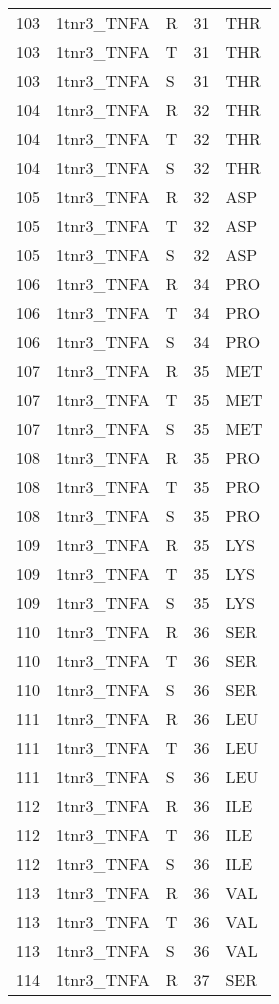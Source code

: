 \begin{tiny}
\begin{longtable}[l]{l|l|l|l|l}
	103 & 1tnr3\_TNFA & R & 31 & THR \\
	103 & 1tnr3\_TNFA & T & 31 & THR \\
	103 & 1tnr3\_TNFA & S & 31 & THR \\
	104 & 1tnr3\_TNFA & R & 32 & THR \\
	104 & 1tnr3\_TNFA & T & 32 & THR \\
	104 & 1tnr3\_TNFA & S & 32 & THR \\
	105 & 1tnr3\_TNFA & R & 32 & ASP \\
	105 & 1tnr3\_TNFA & T & 32 & ASP \\
	105 & 1tnr3\_TNFA & S & 32 & ASP \\
	106 & 1tnr3\_TNFA & R & 34 & PRO \\
	106 & 1tnr3\_TNFA & T & 34 & PRO \\
	106 & 1tnr3\_TNFA & S & 34 & PRO \\
	107 & 1tnr3\_TNFA & R & 35 & MET \\
	107 & 1tnr3\_TNFA & T & 35 & MET \\
	107 & 1tnr3\_TNFA & S & 35 & MET \\
	108 & 1tnr3\_TNFA & R & 35 & PRO \\
	108 & 1tnr3\_TNFA & T & 35 & PRO \\
	108 & 1tnr3\_TNFA & S & 35 & PRO \\
	109 & 1tnr3\_TNFA & R & 35 & LYS \\
	109 & 1tnr3\_TNFA & T & 35 & LYS \\
	109 & 1tnr3\_TNFA & S & 35 & LYS \\
	110 & 1tnr3\_TNFA & R & 36 & SER \\
	110 & 1tnr3\_TNFA & T & 36 & SER \\
	110 & 1tnr3\_TNFA & S & 36 & SER \\
	111 & 1tnr3\_TNFA & R & 36 & LEU \\
	111 & 1tnr3\_TNFA & T & 36 & LEU \\
	111 & 1tnr3\_TNFA & S & 36 & LEU \\
	112 & 1tnr3\_TNFA & R & 36 & ILE \\
	112 & 1tnr3\_TNFA & T & 36 & ILE \\
	112 & 1tnr3\_TNFA & S & 36 & ILE \\
	113 & 1tnr3\_TNFA & R & 36 & VAL \\
	113 & 1tnr3\_TNFA & T & 36 & VAL \\
	113 & 1tnr3\_TNFA & S & 36 & VAL \\
	114 & 1tnr3\_TNFA & R & 37 & SER \\

\end{longtable}
\end{tiny}
